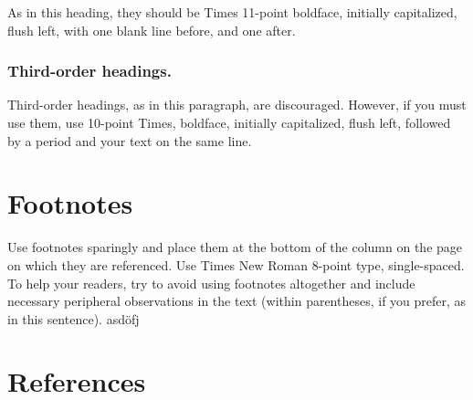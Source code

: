\documentclass[10pt]{article}
\newcommand{\sansserifformat}[1]{\fontfamily{cmss}{ #1}}%
\begin{document}
As in this heading, they should be Times 11-point boldface, initially capitalized, flush left, with one blank line before, and one after.

\subsubsection{Third-order headings. }

Third-order headings, as in this paragraph, are discouraged. However, if you must use them, use 10-point Times, boldface, initially capitalized, flush left, followed by a period and your text on the same line.

\section{Footnotes}

Use footnotes sparingly and place them at the bottom of the column on the page on which they are referenced. Use Times New Roman 8-point type, single-spaced. To help your readers, try to avoid using footnotes altogether and include necessary peripheral observations in the text (within parentheses, if you prefer, as in this sentence).
asdöfj





\section{References}





\end{document}
